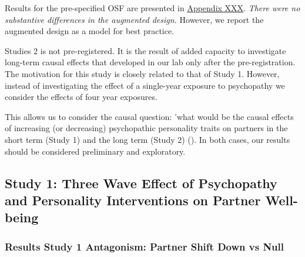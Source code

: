 \documentclass[
  single column]{article}
\begin{document}
Results for the pre-specified OSF are presented in
\href{appendix-XXX}{Appendix XXX}. \emph{There were no substantive
differences in the augmented design.} However, we report the augmented
design as a model for best practice.

Studies 2 is not pre-registered. It is the result of added capacity to
investigate long-term causal effects that developed in our lab only
after the pre-registration. The motivation for this study is closely
related to that of Study 1. However, instead of investigating the effect
of a single-year exposure to psychopathy we consider the effects of four
year exposures.

This allows us to consider the causal question: 'what would be the
causal effects of increasing (or decreasing) psychopathic personality
traits on partners in the short term (Study 1) and the long term (Study
2) (). In both cases,
our results should be considered preliminary and exploratory.

\subsection{Study 1: Three Wave Effect of Psychopathy and Personality
Interventions on Partner
Well-being}\label{study-1-three-wave-effect-of-psychopathy-and-personality-interventions-on-partner-well-being}

\subsubsection{Results Study 1 Antagonism: Partner Shift Down vs
Null}\label{results-study-1-antagonism-partner-shift-down-vs-null}
\end{document}

